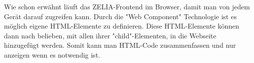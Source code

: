 
Wie schon erwähnt läuft das ZELIA-Frontend im Browser, damit man von jedem Gerät darauf zugreifen kann. Durch die "Web Component" Technologie ist es möglich eigene HTML-Elemente zu definieren. Diese HTML-Elemente können dann nach belieben, mit allen ihrer "child"-Elementen, in die Webseite hinzugefügt werden. Somit kann man HTML-Code zusammenfassen und nur anzeigen wenn es notwendig ist.


\pagebreak
